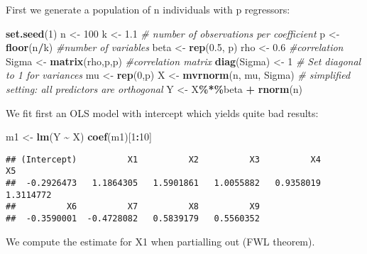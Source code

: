 \documentclass[
]{article}
\newenvironment{Shaded}{\begin{snugshade}}{\end{snugshade}}
\newcommand{\CommentTok}[1]{\textcolor[rgb]{0.56,0.35,0.01}{\textit{#1}}}
\newcommand{\DecValTok}[1]{\textcolor[rgb]{0.00,0.00,0.81}{#1}}
\newcommand{\FloatTok}[1]{\textcolor[rgb]{0.00,0.00,0.81}{#1}}
\newcommand{\FunctionTok}[1]{\textcolor[rgb]{0.13,0.29,0.53}{\textbf{#1}}}
\newcommand{\NormalTok}[1]{#1}
\newcommand{\OtherTok}[1]{\textcolor[rgb]{0.56,0.35,0.01}{#1}}
\newcommand{\SpecialCharTok}[1]{\textcolor[rgb]{0.81,0.36,0.00}{\textbf{#1}}}
\begin{document}
First we generate a population of n individuals with p regressors:

\begin{Shaded}
\begin{Highlighting}[]
\FunctionTok{set.seed}\NormalTok{(}\DecValTok{1}\NormalTok{)}
\NormalTok{n }\OtherTok{\textless{}{-}} \DecValTok{100}
\NormalTok{k }\OtherTok{\textless{}{-}} \FloatTok{1.1} \CommentTok{\# number of observations per coefficient}
\NormalTok{p }\OtherTok{\textless{}{-}} \FunctionTok{floor}\NormalTok{(n}\SpecialCharTok{/}\NormalTok{k) }\CommentTok{\#number of variables}
\NormalTok{beta }\OtherTok{\textless{}{-}} \FunctionTok{rep}\NormalTok{(}\FloatTok{0.5}\NormalTok{, p)}
\NormalTok{rho }\OtherTok{\textless{}{-}} \FloatTok{0.6} \CommentTok{\#correlation}
\NormalTok{Sigma }\OtherTok{\textless{}{-}} \FunctionTok{matrix}\NormalTok{(rho,p,p) }\CommentTok{\#correlation matrix}
\FunctionTok{diag}\NormalTok{(Sigma) }\OtherTok{\textless{}{-}} \DecValTok{1}  \CommentTok{\# Set diagonal to 1 for variances}
\NormalTok{mu }\OtherTok{\textless{}{-}} \FunctionTok{rep}\NormalTok{(}\DecValTok{0}\NormalTok{,p)}
\NormalTok{X }\OtherTok{\textless{}{-}} \FunctionTok{mvrnorm}\NormalTok{(n, mu, Sigma) }\CommentTok{\# simplified setting: all predictors are orthogonal }
\NormalTok{Y }\OtherTok{\textless{}{-}}\NormalTok{ X}\SpecialCharTok{\%*\%}\NormalTok{beta }\SpecialCharTok{+} \FunctionTok{rnorm}\NormalTok{(n)}
\end{Highlighting}
\end{Shaded}

We fit first an OLS model with intercept which yields quite bad results:

\begin{Shaded}
\begin{Highlighting}[]
\NormalTok{m1 }\OtherTok{\textless{}{-}} \FunctionTok{lm}\NormalTok{(Y }\SpecialCharTok{\textasciitilde{}}\NormalTok{ X)}
\FunctionTok{coef}\NormalTok{(m1)[}\DecValTok{1}\SpecialCharTok{:}\DecValTok{10}\NormalTok{]}
\end{Highlighting}
\end{Shaded}

\begin{verbatim}
## (Intercept)          X1          X2          X3          X4          X5 
##  -0.2926473   1.1864305   1.5901861   1.0055882   0.9358019   1.3114772 
##          X6          X7          X8          X9 
##  -0.3590001  -0.4728082   0.5839179   0.5560352
\end{verbatim}

We compute the estimate for X1 when partialling out (FWL theorem).
\end{document}
